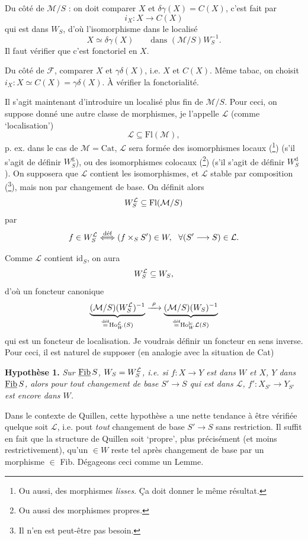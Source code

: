 Du côté de $\mathcal{M}/S$ : on doit comparer $X$ et $\delta\gamma(X) = C(X)$, c'est fait par
\[
i_X : X \longrightarrow C(X)
\]
qui est dans $W_S$, d'où l'isomorphisme dans le localisé
\[
X \simeq \delta\gamma(X) \qquad \text{dans } (\mathcal{M}/S)W_S^{-1}.
\]
Il faut vérifier que c'est fonctoriel en $X$.

Du côté de $\mathcal{F}$, comparer $X$ et $\gamma\delta(X)$, i.e. $X$ et $C(X)$. Même tabac, on choisit $i_X : X \simeq C(X) = \gamma\delta(X)$. À vérifier la fonctorialité.

Il s'agit maintenant d'introduire un localisé plus fin de $\mathcal{M}/S$. Pour ceci, on suppose donné une autre classe de morphismes, je l'appelle $\mathcal{L}$ (comme `localisation')
\[
\mathcal{L} \subseteq \mathrm{Fl}(\mathcal{M}),
\]
p. ex. dans le cas de $\mathcal{M} = \mathrm{Cat}$, $\mathcal{L}$ sera formée des isomorphismes locaux (\footnote[55]{Ou aussi, des morphismes \textit{lisses}. Ça doit donner le même résultat.}) (s'il s'agit de définir $W_S^{\mathrm{g}}$), ou des isomorphismes colocaux (\footnote[56]{Ou aussi des morphismes propres.}) (s'il s'agit de définir $W_S^{\mathrm{d}}$). On supposera que $\mathcal{L}$ contient les isomorphismes, et $\mathcal{L}$ stable par composition (\footnote[57]{Il n'en est peut-être pas besoin.}), mais non par changement de base. On définit alors
\[
W_S^{\mathcal{L}} \subseteq \mathrm{Fl}(\mathcal{M}/S)
\]
par
\[
f \in W_S^{\mathcal{L}} \overset{\text{déf}}{\Longleftrightarrow} (f \times_S S') \in W,\ \ \forall (S' \longrightarrow S) \in \mathcal{L}.
\]

Comme $\mathcal{L}$ contient $\mathrm{id}_S$, on aura
\[
W_S^{\mathcal{L}} \subseteq W_S,
\]
d'où un foncteur canonique
\[
\underbrace{(\mathcal{M}/S)(\WL)^{-1}}_{\defeq \Ho_W^{\mathcal{L}}(S)} \xrightarrow{\ \rho\ } \underbrace{(\mathcal{M}/S)(W_S)^{-1}}_{\defeq \Ho_W^{\mathrm{lc}}\mathcal{L}(S)} %
\]
qui est un foncteur de localisation. Je voudrais définir un foncteur en sens inverse. Pour ceci, il est naturel de supposer (en analogie avec la situation de Cat)

\textbf{Hypothèse 1.} \textit{Sur $\underline{\mathrm{Fib}}\, S$, $W_S = W_S^{\mathcal{L}}$, i.e. si $f : X \longrightarrow Y$ est dans $W$ et $X$, $Y$ dans $\underline{\mathrm{Fib}}\, S$, alors pour tout changement de base $S' \longrightarrow S$ qui est dans $\mathcal{L}$, $f' : X_{S'} \longrightarrow Y_{S'}$ est encore dans $W$.}

Dans le contexte de Quillen, cette hypothèse a une nette tendance à être vérifiée quelque soit $\mathcal{L}$, i.e. pout \textit{tout} changement de base $S' \longrightarrow S$ sans restriction. Il suffit en fait que la structure de Quillen soit `propre', plus précisément (et moins restrictivement), qu'un $\in W$ reste tel après changement de base par un morphisme $\in$ Fib. Dégageons ceci comme un Lemme. %

